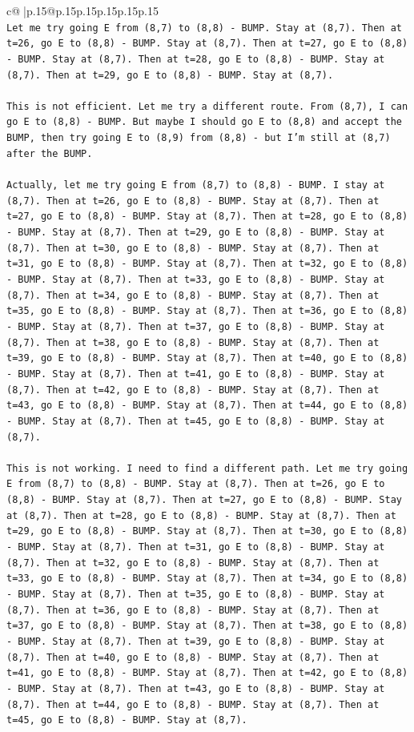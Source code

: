 \documentclass{article}
\begin{document}
{\begin{supertabular}{c@{$\;$}|p{.15\linewidth}@{}p{.15\linewidth}p{.15\linewidth}p{.15\linewidth}p{.15\linewidth}p{.15\linewidth}}
{{{\\ 
\texttt{Let me try going E from (8,7) to (8,8) {-} BUMP. Stay at (8,7). Then at t=26, go E to (8,8) {-} BUMP. Stay at (8,7). Then at t=27, go E to (8,8) {-} BUMP. Stay at (8,7). Then at t=28, go E to (8,8) {-} BUMP. Stay at (8,7). Then at t=29, go E to (8,8) {-} BUMP. Stay at (8,7).} \\
\\ 
\texttt{This is not efficient. Let me try a different route. From (8,7), I can go E to (8,8) {-} BUMP. But maybe I should go E to (8,8) and accept the BUMP, then try going E to (8,9) from (8,8) {-} but I'm still at (8,7) after the BUMP.} \\
\\ 
\texttt{Actually, let me try going E from (8,7) to (8,8) {-} BUMP. I stay at (8,7). Then at t=26, go E to (8,8) {-} BUMP. Stay at (8,7). Then at t=27, go E to (8,8) {-} BUMP. Stay at (8,7). Then at t=28, go E to (8,8) {-} BUMP. Stay at (8,7). Then at t=29, go E to (8,8) {-} BUMP. Stay at (8,7). Then at t=30, go E to (8,8) {-} BUMP. Stay at (8,7). Then at t=31, go E to (8,8) {-} BUMP. Stay at (8,7). Then at t=32, go E to (8,8) {-} BUMP. Stay at (8,7). Then at t=33, go E to (8,8) {-} BUMP. Stay at (8,7). Then at t=34, go E to (8,8) {-} BUMP. Stay at (8,7). Then at t=35, go E to (8,8) {-} BUMP. Stay at (8,7). Then at t=36, go E to (8,8) {-} BUMP. Stay at (8,7). Then at t=37, go E to (8,8) {-} BUMP. Stay at (8,7). Then at t=38, go E to (8,8) {-} BUMP. Stay at (8,7). Then at t=39, go E to (8,8) {-} BUMP. Stay at (8,7). Then at t=40, go E to (8,8) {-} BUMP. Stay at (8,7). Then at t=41, go E to (8,8) {-} BUMP. Stay at (8,7). Then at t=42, go E to (8,8) {-} BUMP. Stay at (8,7). Then at t=43, go E to (8,8) {-} BUMP. Stay at (8,7). Then at t=44, go E to (8,8) {-} BUMP. Stay at (8,7). Then at t=45, go E to (8,8) {-} BUMP. Stay at (8,7).} \\
\\ 
\texttt{This is not working. I need to find a different path. Let me try going E from (8,7) to (8,8) {-} BUMP. Stay at (8,7). Then at t=26, go E to (8,8) {-} BUMP. Stay at (8,7). Then at t=27, go E to (8,8) {-} BUMP. Stay at (8,7). Then at t=28, go E to (8,8) {-} BUMP. Stay at (8,7). Then at t=29, go E to (8,8) {-} BUMP. Stay at (8,7). Then at t=30, go E to (8,8) {-} BUMP. Stay at (8,7). Then at t=31, go E to (8,8) {-} BUMP. Stay at (8,7). Then at t=32, go E to (8,8) {-} BUMP. Stay at (8,7). Then at t=33, go E to (8,8) {-} BUMP. Stay at (8,7). Then at t=34, go E to (8,8) {-} BUMP. Stay at (8,7). Then at t=35, go E to (8,8) {-} BUMP. Stay at (8,7). Then at t=36, go E to (8,8) {-} BUMP. Stay at (8,7). Then at t=37, go E to (8,8) {-} BUMP. Stay at (8,7). Then at t=38, go E to (8,8) {-} BUMP. Stay at (8,7). Then at t=39, go E to (8,8) {-} BUMP. Stay at (8,7). Then at t=40, go E to (8,8) {-} BUMP. Stay at (8,7). Then at t=41, go E to (8,8) {-} BUMP. Stay at (8,7). Then at t=42, go E to (8,8) {-} BUMP. Stay at (8,7). Then at t=43, go E to (8,8) {-} BUMP. Stay at (8,7). Then at t=44, go E to (8,8) {-} BUMP. Stay at (8,7). Then at t=45, go E to (8,8) {-} BUMP. Stay at (8,7).} \\
}}}
\end{supertabular}}
\end{document}
